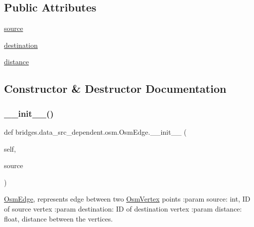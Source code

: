 \subsection*{Public Attributes}
\begin{DoxyCompactItemize}
\item 
\hyperlink{classbridges_1_1data__src__dependent_1_1osm_1_1_osm_edge_a968664892933e9784909282cc53b0315}{source}
\item 
\hyperlink{classbridges_1_1data__src__dependent_1_1osm_1_1_osm_edge_aa81426d41bd031b2fa3789173206c0dc}{destination}
\item 
\hyperlink{classbridges_1_1data__src__dependent_1_1osm_1_1_osm_edge_aed843c7fcb887bb11b609387fc3af35f}{distance}
\end{DoxyCompactItemize}


\subsection{Constructor \& Destructor Documentation}
\mbox{\label{classbridges_1_1data__src__dependent_1_1osm_1_1_osm_edge_ac0f57be58220744c49bffc353d73db6f}} 
\subsubsection{\texorpdfstring{\+\_\+\+\_\+init\+\_\+\+\_\+()}{\_\_init\_\_()}}
{\footnotesize\ttfamily def bridges.\+data\+\_\+src\+\_\+dependent.\+osm.\+Osm\+Edge.\+\_\+\+\_\+init\+\_\+\+\_\+ (\begin{DoxyParamCaption}\item[{}]{self,  }\item[{}]{source }\end{DoxyParamCaption})}



\hyperlink{classbridges_1_1data__src__dependent_1_1osm_1_1_osm_edge}{Osm\+Edge}, represents edge between two \hyperlink{classbridges_1_1data__src__dependent_1_1osm_1_1_osm_vertex}{Osm\+Vertex} points \+:param source\+: int, ID of source vertex \+:param destination\+: ID of destination vertex \+:param distance\+: float, distance between the vertices. 




